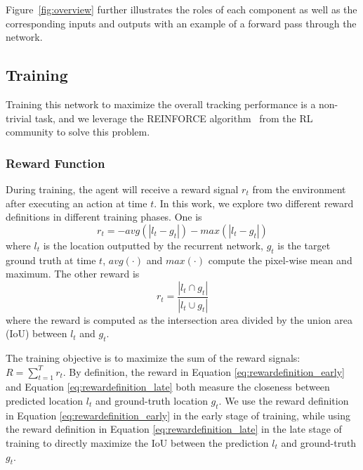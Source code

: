 \documentclass[10pt,twocolumn,letterpaper]{article}
\begin{document}
Figure~\ref{fig:overview} further illustrates the roles of each component as well as the corresponding inputs and outputs with an example of a forward pass through the network.
\subsection{Training}
\label{subsec:training}

Training this network to maximize the overall tracking performance is a non-trivial task, and we leverage the REINFORCE algorithm~\cite{williams1992simple} from the RL community to solve this problem.

\subsubsection{Reward Function}

During training, the agent will receive a reward signal $r_t$ from the environment after executing an action at time $t$. In this work, we explore two different reward definitions in different training phases. One is 
\begin{equation}
	r_t=-avg(|l_t-g_t|)-max(|l_t-g_t|)
    \label{eq:rewardefinition_early}
\end{equation}
where $l_t$ is the location outputted by the recurrent network, $g_t$ is the target ground truth at time $t$, $avg(\cdot)$ and $max(\cdot)$ compute the pixel-wise mean and maximum. The other reward is 
\begin{equation}
	r_t=\frac{|l_t\cap g_t|}{|l_t\cup g_t|}
    \label{eq:rewardefinition_late}
\end{equation}
where the reward is computed as the intersection area divided by the union area (IoU) between $l_t$ and $g_t$. 

The training objective is to maximize the sum of the reward signals: $R=\sum_{t=1}^{T}r_t$. By definition, the reward in Equation \ref{eq:rewardefinition_early} and Equation \ref{eq:rewardefinition_late} both measure the closeness between predicted location $l_t$ and ground-truth location $g_t$. We use the reward definition in Equation \ref{eq:rewardefinition_early} in the early stage of training, while using the reward definition in Equation \ref{eq:rewardefinition_late} in the late stage of training to directly maximize the IoU  between the prediction $l_t$ and ground-truth $g_t$.
\end{document}
